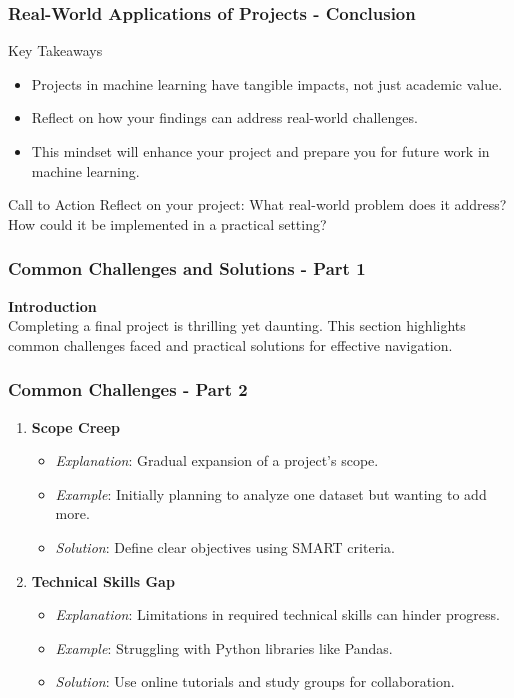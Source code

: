 \documentclass[aspectratio=169]{beamer}
\begin{document}
\begin{frame}[fragile]
    \frametitle{Real-World Applications of Projects - Conclusion}
    \begin{block}{Key Takeaways}
        \begin{itemize}
            \item Projects in machine learning have tangible impacts, not just academic value.
            \item Reflect on how your findings can address real-world challenges.
            \item This mindset will enhance your project and prepare you for future work in machine learning.
        \end{itemize}
    \end{block}
    
    \begin{block}{Call to Action}
        Reflect on your project: What real-world problem does it address? How could it be implemented in a practical setting?
    \end{block}
\end{frame}

\begin{frame}[fragile]
    \frametitle{Common Challenges and Solutions - Part 1}
    \textbf{Introduction} \\
    Completing a final project is thrilling yet daunting. This section highlights common challenges faced and practical solutions for effective navigation.
\end{frame}

\begin{frame}[fragile]
    \frametitle{Common Challenges - Part 2}

    \begin{enumerate}
        \item \textbf{Scope Creep}
            \begin{itemize}
                \item \textit{Explanation}: Gradual expansion of a project's scope.
                \item \textit{Example}: Initially planning to analyze one dataset but wanting to add more.
                \item \textit{Solution}: Define clear objectives using SMART criteria.
            \end{itemize}

        \item \textbf{Technical Skills Gap}
            \begin{itemize}
                \item \textit{Explanation}: Limitations in required technical skills can hinder progress.
                \item \textit{Example}: Struggling with Python libraries like Pandas.
                \item \textit{Solution}: Use online tutorials and study groups for collaboration.
            \end{itemize}
    \end{enumerate}
\end{frame}
\end{document}
